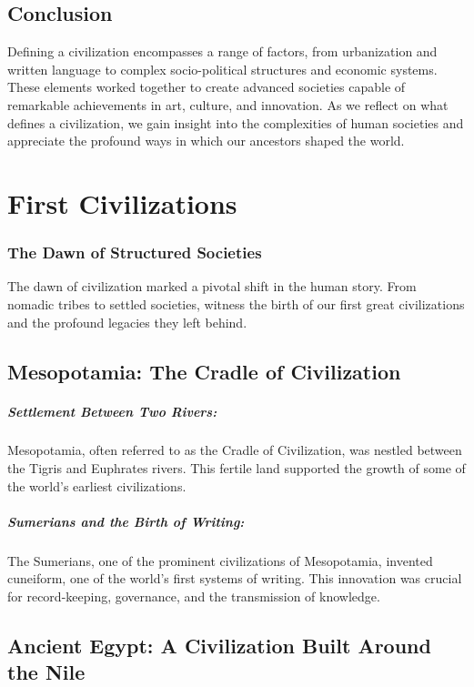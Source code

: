 \documentclass[a4paper,12pt]{book}
\begin{document}
\section*{Conclusion}

Defining a civilization encompasses a range of factors, from urbanization and written language to complex socio-political structures and economic systems. These elements worked together to create advanced societies capable of remarkable achievements in art, culture, and innovation. As we reflect on what defines a civilization, we gain insight into the complexities of human societies and appreciate the profound ways in which our ancestors shaped the world.

\chapter{First Civilizations}
\subsection*{The Dawn of Structured Societies}
The dawn of civilization marked a pivotal shift in the human story. From nomadic tribes to settled societies, witness the birth of our first great civilizations and the profound legacies they left behind.

\section*{Mesopotamia: The Cradle of Civilization}

\paragraph{Settlement Between Two Rivers:}
Mesopotamia, often referred to as the Cradle of Civilization, was nestled between the Tigris and Euphrates rivers. This fertile land supported the growth of some of the world's earliest civilizations.

\paragraph{Sumerians and the Birth of Writing:}
The Sumerians, one of the prominent civilizations of Mesopotamia, invented cuneiform, one of the world's first systems of writing. This innovation was crucial for record-keeping, governance, and the transmission of knowledge.

\section*{Ancient Egypt: A Civilization Built Around the Nile}
\end{document}
